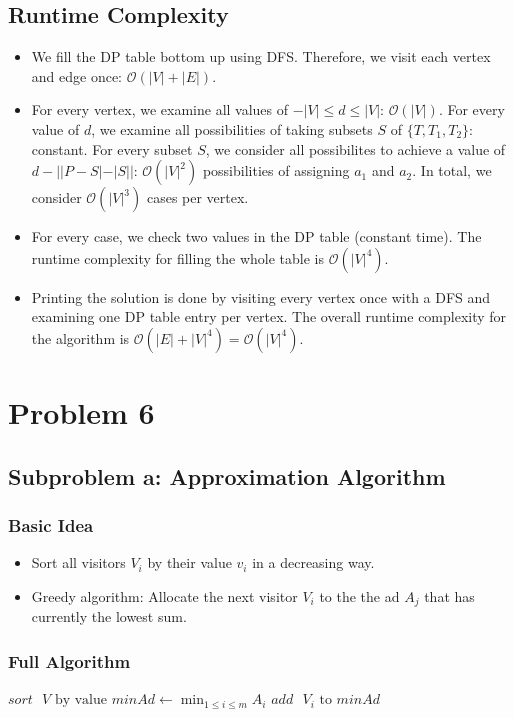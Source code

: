 \documentclass[12pt]{article}
\begin{document}
\subsection*{Runtime Complexity}
\begin{itemize}
	\item We fill the DP table bottom up using DFS. Therefore, we visit each vertex and edge once: $\mathcal{O}(|V| + |E|)$.
	\item For every vertex, we examine all values of $-|V| \leq d \leq |V|$: $\mathcal{O}(|V|)$. For every value of $d$, we examine all possibilities of taking subsets $S$ of $\{T, T_1, T_2\}$: constant. For every subset $S$, we consider all possibilites to achieve a value of $d - ||P-S| - |S||$: $\mathcal{O}(|V|^2)$ possibilities of assigning $a_1$ and $a_2$. In total, we consider $\mathcal{O}(|V|^3)$ cases per vertex.
	\item For every case, we check two values in the DP table (constant time). The runtime complexity for filling the whole table is $\mathcal{O}(|V|^4)$.
	\item Printing the solution is done by visiting every vertex once with a DFS and examining one DP table entry per vertex. The overall runtime complexity for the algorithm is $\mathcal{O}(|E| + |V|^4) = \mathcal{O}(|V|^4)$.
\end{itemize}

\section*{Problem 6}
\subsection*{Subproblem a: Approximation Algorithm}
\subsubsection*{Basic Idea}
\begin{itemize}
	\item Sort all visitors $V_i$ by their value $v_i$ in a decreasing way.
	\item Greedy algorithm: Allocate the next visitor $V_i$ to the the ad $A_j$ that has currently the lowest sum.
\end{itemize}

\subsubsection*{Full Algorithm}
\begin{algorithmic}
	\State $\mathit{sort} \mbox{ $V$ by value}$
		\State $\mathit{minAd} \gets \min_{1 \leq i \leq m} A_i$
		\State $\mathit{add} \mbox{ $V_i$ to } \mathit{minAd}$
	\EndFor
\end{algorithmic}
\end{document}

